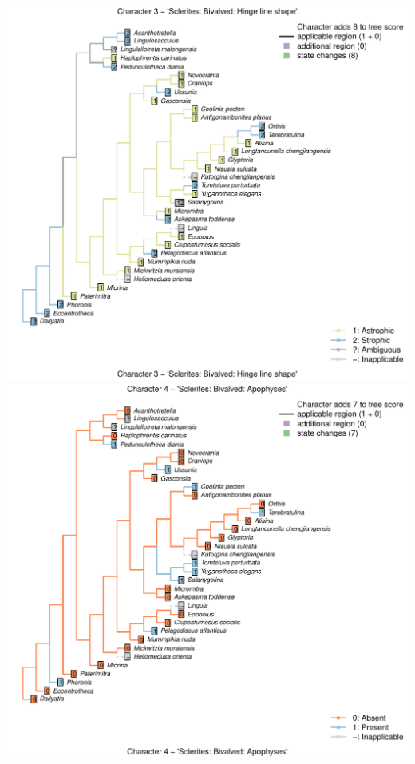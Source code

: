 \documentclass[]{book}
\theoremstyle{definition}
\theoremstyle{definition}
\theoremstyle{definition}
\theoremstyle{remark}
\begin{document}
\includegraphics{Brachiopod_phylogeny_files/figure-latex/unnamed-chunk-4-3.pdf}
\includegraphics{Brachiopod_phylogeny_files/figure-latex/unnamed-chunk-4-4.pdf}
\end{document}
